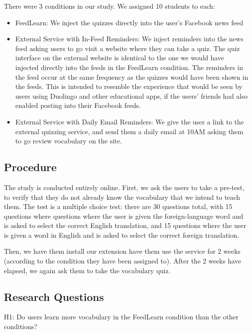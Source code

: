 \documentclass{chi-ext}
\begin{document}
There were 3 conditions in our study. We assigned 10 students to each:

\begin{itemize}
\item FeedLearn: We inject the quizzes directly into the user's Facebook news feed
\item External Service with In-Feed Reminders: We inject reminders into the news feed asking users to go visit a website where they can take a quiz. The quiz interface on the external website is identical to the one we would have injected directly into the feeds in the FeedLearn condition. The reminders in the feed occur at the same frequency as the quizzes would have been shown in the feeds. This is intended to resemble the experience that would be seen by users using Duolingo and other educational apps, if the users' friends had also enabled posting into their Facebook feeds.
\item External Service with Daily Email Reminders: We give the user a link to the external quizzing service, and send them a daily email at 10AM asking them to go review vocabulary on the site.
\end{itemize}

\subsection{Procedure}

The study is conducted entirely online. First, we ask the users to take a pre-test, to verify that they do not already know the vocabulary that we intend to teach them. The test is a multiple choice test: there are 30 questions total, with 15 questions where questions where the user is given the foreign-language word and is asked to select the correct English translation, and 15 questions where the user is given a word in English and is asked to select the correct foreign translation.

Then, we have them install our extension have them use the service for 2 weeks (according to the condition they have been assigned to). After the 2 weeks have elapsed, we again ask them to take the vocabulary quiz.

\subsection{Research Questions}

H1: Do users learn more vocabulary in the FeedLearn condition than the other conditions?
\end{document}
